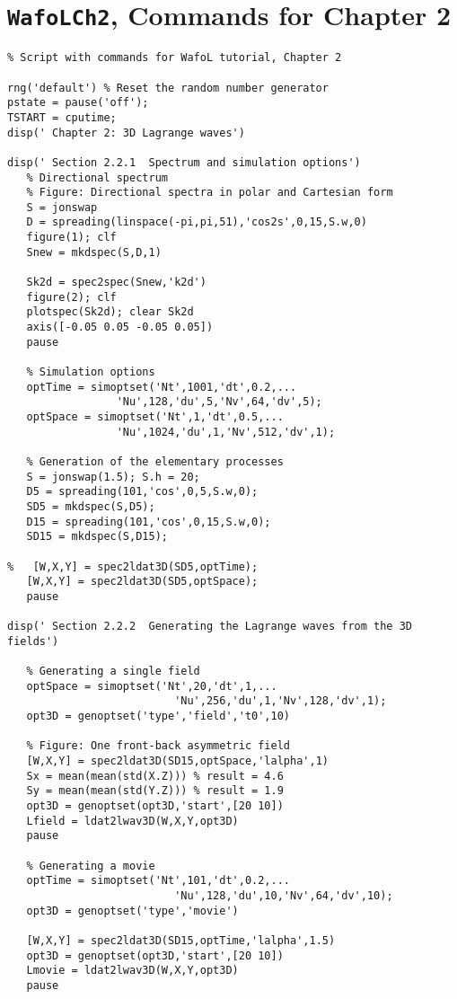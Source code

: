 \section{{\tt WafoLCh2}, Commands for Chapter 2}
{\small\begin{verbatim}
% Script with commands for WafoL tutorial, Chapter 2

rng('default') % Reset the random number generator
pstate = pause('off');
TSTART = cputime;
disp(' Chapter 2: 3D Lagrange waves')

disp(' Section 2.2.1  Spectrum and simulation options')
   % Directional spectrum
   % Figure: Directional spectra in polar and Cartesian form
   S = jonswap
   D = spreading(linspace(-pi,pi,51),'cos2s',0,15,S.w,0)
   figure(1); clf 
   Snew = mkdspec(S,D,1) 

   Sk2d = spec2spec(Snew,'k2d')
   figure(2); clf
   plotspec(Sk2d); clear Sk2d
   axis([-0.05 0.05 -0.05 0.05])
   pause
   
   % Simulation options
   optTime = simoptset('Nt',1001,'dt',0.2,...
                 'Nu',128,'du',5,'Nv',64,'dv',5);
   optSpace = simoptset('Nt',1,'dt',0.5,...
                 'Nu',1024,'du',1,'Nv',512,'dv',1);

   % Generation of the elementary processes
   S = jonswap(1.5); S.h = 20;
   D5 = spreading(101,'cos',0,5,S.w,0);
   SD5 = mkdspec(S,D5);
   D15 = spreading(101,'cos',0,15,S.w,0); 
   SD15 = mkdspec(S,D15);

%   [W,X,Y] = spec2ldat3D(SD5,optTime);
   [W,X,Y] = spec2ldat3D(SD5,optSpace);
   pause
   
disp(' Section 2.2.2  Generating the Lagrange waves from the 3D fields')

   % Generating a single field
   optSpace = simoptset('Nt',20,'dt',1,...
                          'Nu',256,'du',1,'Nv',128,'dv',1);
   opt3D = genoptset('type','field','t0',10)

   % Figure: One front-back asymmetric field
   [W,X,Y] = spec2ldat3D(SD15,optSpace,'lalpha',1)
   Sx = mean(mean(std(X.Z))) % result = 4.6
   Sy = mean(mean(std(Y.Z))) % result = 1.9
   opt3D = genoptset(opt3D,'start',[20 10])
   Lfield = ldat2lwav3D(W,X,Y,opt3D)
   pause
   
   % Generating a movie
   optTime = simoptset('Nt',101,'dt',0.2,...
                          'Nu',128,'du',10,'Nv',64,'dv',10);
   opt3D = genoptset('type','movie')

   [W,X,Y] = spec2ldat3D(SD15,optTime,'lalpha',1.5)
   opt3D = genoptset(opt3D,'start',[20 10])
   Lmovie = ldat2lwav3D(W,X,Y,opt3D)
   pause
   

\end{verbatim}}
